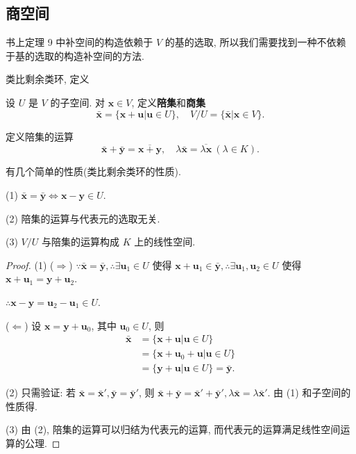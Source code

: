 \documentclass[color=black,device=normal,lang=cn,mode=geye]{elegantnote}
\begin{document}
\subsection{商空间}
书上定理 9 中补空间的构造依赖于 $V$ 的基的选取, 所以我们需要找到一种不依赖于基的选取的构造补空间的方法.

类比剩余类环, 定义
\begin{definition}
    设 $U$ 是 $V$ 的子空间. 对 $\boldsymbol{x}\in V$, 定义\textbf{陪集}和\textbf{商集}
    \[\bar{\boldsymbol{x}}=\{\boldsymbol{x}+\boldsymbol{u}|\boldsymbol{u}\in U\},\quad V/U=\{\bar{\boldsymbol{x}}|\boldsymbol{x}\in V\}.\]

    定义陪集的运算
    \[\bar{\boldsymbol{x}}+\bar{\boldsymbol{y}}=\overline{\boldsymbol{x}+\boldsymbol{y}},\quad\lambda\bar{\boldsymbol{x}}=\overline{\lambda\boldsymbol{x}}\ (\lambda\in K).\]
\end{definition}
有几个简单的性质(类比剩余类环的性质).
\begin{property}\label{p1.3}
    (1) $\bar{\boldsymbol{x}}=\bar{\boldsymbol{y}}\Leftrightarrow\boldsymbol{x}-\boldsymbol{y}\in U$.

    (2) 陪集的运算与代表元的选取无关.

    (3) $V/U$ 与陪集的运算构成 $K$ 上的线性空间.
\end{property}
\begin{proof}
    (1) ($\Rightarrow$) $\because\bar{\boldsymbol{x}}=\bar{\boldsymbol{y}},\therefore\exists\boldsymbol{u}_1\in U$ 使得 $\boldsymbol{x}+\boldsymbol{u}_1\in\bar{\boldsymbol{y}},\therefore\exists\boldsymbol{u}_1,\boldsymbol{u}_2\in U$ 使得 $\boldsymbol{x}+\boldsymbol{u}_1=\boldsymbol{y}+\boldsymbol{u}_2$.

    $\therefore\boldsymbol{x}-\boldsymbol{y}=\boldsymbol{u}_2-\boldsymbol{u}_1\in U$.

    ($\Leftarrow$) 设 $\boldsymbol{x}=\boldsymbol{y}+\boldsymbol{u}_0$, 其中 $\boldsymbol{u}_0\in U$, 则
    \begin{align*}
        \bar{\boldsymbol{x}} & =\{\boldsymbol{x}+\boldsymbol{u}|\boldsymbol{u}\in U\} \\
        & =\{\boldsymbol{x}+\boldsymbol{u}_0+\boldsymbol{u}|\boldsymbol{u}\in U\} \\
        & =\{\boldsymbol{y}+\boldsymbol{u}|\boldsymbol{u}\in U\}=\bar{\boldsymbol{y}}.
    \end{align*}

    (2) 只需验证: 若 $\bar{\boldsymbol{x}}=\bar{\boldsymbol{x}}',\bar{\boldsymbol{y}}=\bar{\boldsymbol{y}}'$, 则 $\bar{\boldsymbol{x}}+\bar{\boldsymbol{y}}=\bar{\boldsymbol{x}}'+\bar{\boldsymbol{y}}',\lambda\bar{\boldsymbol{x}}=\lambda\bar{\boldsymbol{x}}'$. 由 (1) 和子空间的性质得.

    (3) 由 (2), 陪集的运算可以归结为代表元的运算, 而代表元的运算满足线性空间运算的公理.
\end{proof}
\end{document}
